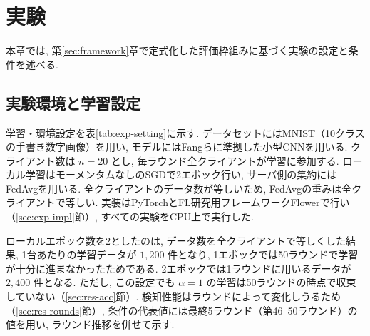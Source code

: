 \documentclass[a4j, twocolumn, dvipdfmx]{jsarticle}
\begin{document}

\section{実験}
\label{sec:experiment}

本章では, 第\ref{sec:framework}章で定式化した評価枠組みに基づく実験の設定と条件を述べる.

\subsection{実験環境と学習設定}
\label{sec:exp-setting}

学習・環境設定を表\ref{tab:exp-setting}に示す. データセットにはMNIST（10クラスの手書き数字画像）を用い, モデルにはFangら\cite{fang2020local}に準拠した小型CNNを用いる. クライアント数は $n=20$ とし, 毎ラウンド全クライアントが学習に参加する. ローカル学習はモーメンタムなしのSGDで2エポック行い, サーバ側の集約にはFedAvgを用いる. 全クライアントのデータ数が等しいため, FedAvgの重みは全クライアントで等しい. 実装はPyTorchとFL研究用フレームワークFlower\cite{beutel2020flower}で行い（\ref{sec:exp-impl}節）, すべての実験をCPU上で実行した.

ローカルエポック数を2としたのは, データ数を全クライアントで等しくした結果, 1台あたりの学習データが $1{,}200$ 件となり, 1エポックでは50ラウンドで学習が十分に進まなかったためである. 2エポックでは1ラウンドに用いるデータが $2{,}400$ 件となる. ただし, この設定でも $\alpha=1$ の学習は50ラウンドの時点で収束していない（\ref{sec:res-acc}節）. 検知性能はラウンドによって変化しうるため（\ref{sec:res-rounds}節）, 条件の代表値には最終5ラウンド（第46--50ラウンド）の値を用い, ラウンド推移を併せて示す.
\end{document}
